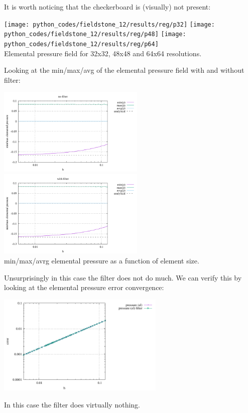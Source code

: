 \newpage
It is worth noticing that the checkerboard is (visually) not present:
\begin{center}
\texttt{[image: python\_codes/fieldstone\_12/results/reg/p32]}
\texttt{[image: python\_codes/fieldstone\_12/results/reg/p48]}
\texttt{[image: python\_codes/fieldstone\_12/results/reg/p64]}\\
{\captionfont Elemental pressure field for 32x32, 48x48 and 64x64 resolutions.}
\end{center}

Looking at the min/max/avg of the elemental pressure field 
with and without filter:
\begin{center}
\includegraphics[width=7cm]{python_codes/fieldstone_12/results/reg/rawp_nofilter.pdf}
\includegraphics[width=7cm]{python_codes/fieldstone_12/results/reg/rawp_filter.pdf}\\
{\captionfont min/max/avrg elemental pressure as a function of element size.}
\end{center}
Unsurprisingly in this case the filter does not do much. 
We can verify this by looking at the elemental pressure error convergence:

\begin{center}
\includegraphics[width=8cm]{python_codes/fieldstone_12/results/reg/errorsP_both.pdf}
\end{center}
In this case the filter does virtually nothing.


